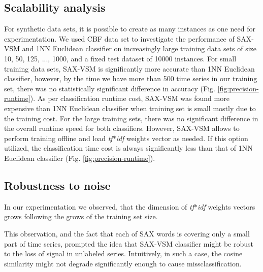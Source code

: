 \documentclass{llncs}
\begin{document}
\subsection{Scalability analysis}
For synthetic data sets, it is possible to create as many instances as one need for experimentation.
We used CBF data set \cite{cbf} to investigate the performance of SAX-VSM and 1NN Euclidean
classifier on increasingly large training data sets of size 10, 50, 125, ..., 1000, and a fixed test
dataset of 10000 instances. For small training data sets, SAX-VSM is signiﬁcantly more accurate
than 1NN Euclidean classifier, however, by the time we have more than 500 time series in
our training set, there was no statistically signiﬁcant diﬀerence in accuracy (Fig.
\ref{fig:precision-runtime}). 
As per classification runtime cost, SAX-VSM was found more expensive than 1NN Euclidean classifier
when training set is small mostly due to the training cost. For the large training sets, there was
no significant difference in the overall runtime speed for both classifiers.
However, SAX-VSM allows to perform training offline and load \textit{tf$\ast$idf} weights vector as
needed. If this option utilized, the classification time cost is always significantly less than that
of 1NN Euclidean classifier (Fig. \ref{fig:precision-runtime}).

\subsection{Robustness to noise}
In our experimentation we observed, that the dimension of \textit{tf$\ast$idf} weights vectors 
grows following the grows of the training set size. 

This observation, and the fact that each of SAX words is covering only a small part of time 
series, prompted the idea that SAX-VSM classifier might be robust to the loss of signal 
in unlabeled series. Intuitively, in such a case, the cosine similarity might not
degrade significantly enough to cause missclassification.
\end{document}
